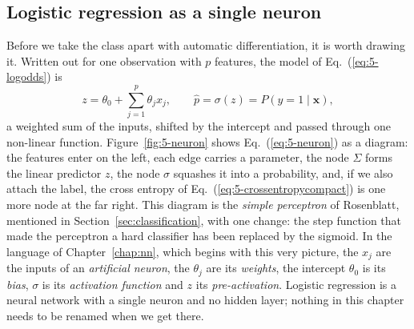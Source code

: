 \subsection{Logistic regression as a single neuron}
\label{sec:logregneuron}

Before we take the class apart with automatic differentiation, it is worth
drawing it.  Written out for one observation with $p$ features, the model
of Eq.~(\ref{eq:5-logodds}) is
\begin{equation}
  z = \theta_0 + \sum_{j=1}^{p}\theta_j x_j ,
  \qquad
  \hat p = \sigma(z) = P(y=1\mid\bm{x}) ,
  \label{eq:5-neuron}
\end{equation}
a weighted sum of the inputs, shifted by the intercept and passed through
one non-linear function.  Figure~\ref{fig:5-neuron} shows
Eq.~(\ref{eq:5-neuron}) as a diagram: the features enter on the left, each
edge carries a parameter, the node $\Sigma$ forms the linear predictor $z$,
the node $\sigma$ squashes it into a probability, and, if we also attach
the label, the cross entropy of Eq.~(\ref{eq:5-crossentropycompact}) is one
more node at the far right.  This diagram is the \emph{simple perceptron}
of Rosenblatt, mentioned in Section~\ref{sec:classification}, with one
change: the step function that made the perceptron a hard classifier has
been replaced by the sigmoid.  In the language of Chapter~\ref{chap:nn},
which begins with this very picture, the $x_j$ are the inputs of an
\emph{artificial neuron}, the $\theta_j$ are its \emph{weights}, the
intercept $\theta_0$ is its \emph{bias}, $\sigma$ is its \emph{activation
function} and $z$ its \emph{pre-activation}.  Logistic regression is a
neural network with a single neuron and no hidden layer; nothing in this
chapter needs to be renamed when we get there.


